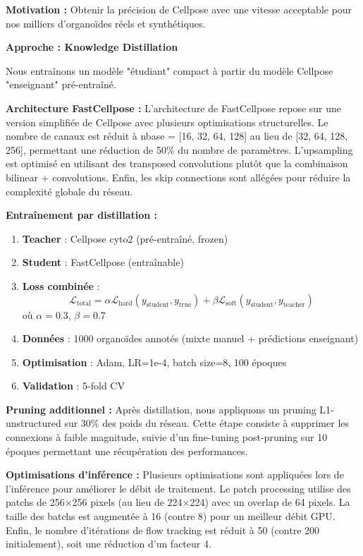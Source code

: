 \textbf{Motivation :}
Obtenir la précision de Cellpose avec une vitesse acceptable pour nos milliers d'organoïdes réels et synthétiques.

\textbf{Approche : Knowledge Distillation}

Nous entraînons un modèle "étudiant" compact à partir du modèle Cellpose "enseignant" pré-entraîné.

\textbf{Architecture FastCellpose :}
L'architecture de FastCellpose repose sur une version simplifiée de Cellpose avec plusieurs optimisations structurelles. Le nombre de canaux est réduit à nbase = [16, 32, 64, 128] au lieu de [32, 64, 128, 256], permettant une réduction de 50\% du nombre de paramètres. L'upsampling est optimisé en utilisant des transposed convolutions plutôt que la combinaison bilinear + convolutions. Enfin, les skip connections sont allégées pour réduire la complexité globale du réseau.

\textbf{Entraînement par distillation :}
\begin{enumerate}
    \item \textbf{Teacher} : Cellpose cyto2 (pré-entraîné, frozen)
    \item \textbf{Student} : FastCellpose (entraînable)
    \item \textbf{Loss combinée} :
        \[
        \mathcal{L}_{\text{total}} = \alpha \mathcal{L}_{\text{hard}}(y_{\text{student}}, y_{\text{true}}) + \beta \mathcal{L}_{\text{soft}}(y_{\text{student}}, y_{\text{teacher}})
        \]
        où $\alpha = 0.3$, $\beta = 0.7$
    \item \textbf{Données} : 1000 organoïdes annotés (mixte manuel + prédictions enseignant)
    \item \textbf{Optimisation} : Adam, LR=1e-4, batch size=8, 100 époques
    \item \textbf{Validation} : 5-fold CV
\end{enumerate}

\textbf{Pruning additionnel :}
Après distillation, nous appliquons un pruning L1-unstructured sur 30\% des poids du réseau. Cette étape consiste à supprimer les connexions à faible magnitude, suivie d'un fine-tuning post-pruning sur 10 époques permettant une récupération des performances.

\textbf{Optimisations d'inférence :}
Plusieurs optimisations sont appliquées lors de l'inférence pour améliorer le débit de traitement. Le patch processing utilise des patchs de 256×256 pixels (au lieu de 224×224) avec un overlap de 64 pixels. La taille des batchs est augmentée à 16 (contre 8) pour un meilleur débit GPU. Enfin, le nombre d'itérations de flow tracking est réduit à 50 (contre 200 initialement), soit une réduction d'un facteur 4.

